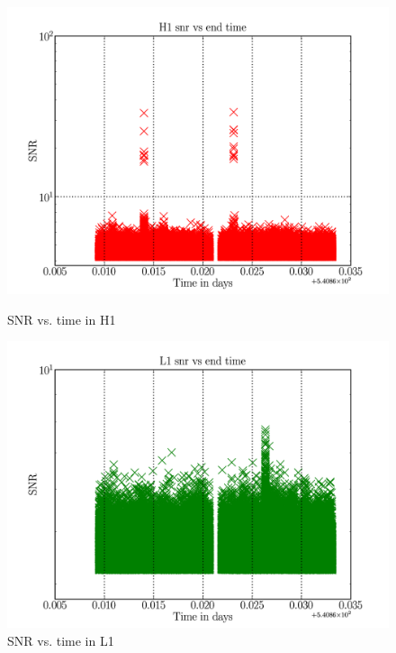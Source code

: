 \documentclass[epsf]{article}
\begin{document}
\begin{figure}[ht]
\begin{minipage}[b]{0.5\linewidth}
\centering
\includegraphics[scale=0.15]{H1_SNR_time.png}
\caption{SNR vs. time in H1}
\label{fig:figure1}
\end{minipage}
\hspace{0.5cm}
\begin{minipage}[b]{0.5\linewidth}
\centering
\includegraphics[scale=0.15]{L1_SNR_time.png}
\caption{SNR vs. time in L1}
\label{fig:figure2}
\end{minipage}
\end{figure}
\end{document}
